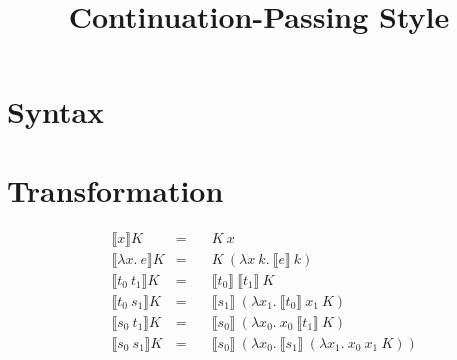 
\usepackage{graphicx}
\usepackage{mdframed}
\usepackage{stmaryrd}

\newcommand\fun\lambda
\newcommand{\K}[1]{\llbracket #1\rrbracket}
\newcommand{\kdef}[2]{&\K{#1}K&=\quad&#2}

\title{Continuation-Passing Style}
\date{}


\maketitle

\section*{Syntax}
\begin{figure}[h]
\begin{mdframed}
\ottmetavars

\ottgrammar
\end{mdframed}
\end{figure}

\section*{Transformation}
\begin{align*}
\kdef{x}{K~x}\\
\kdef{\fun x.~e}{K~(\fun x~k.~\K{e}~k)}\\
\kdef{t_0~t_1}{\K{t_0}~\K{t_1}~K}\\
\kdef{t_0~s_1}{\K{s_1}~(\fun x_1.~\K{t_0}~x_1~K)}\\
\kdef{s_0~t_1}{\K{s_0}~(\fun x_0.~x_0~\K{t_1}~K)}\\
\kdef{s_0~s_1}{\K{s_0}~(\fun x_0.~\K{s_1}~(\fun x_1.~x_0~x_1~K))}
\end{align*}

